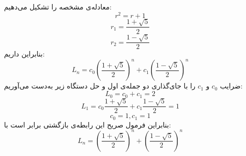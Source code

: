 	\p
معادله‌ی مشخصه را تشکیل می‌دهیم:
$$r^2 = r + 1$$
$$r_1 = \frac{1 + \sqrt{5}}{2}$$
$$r_2 = \frac{1 - \sqrt{5}}{2}$$
بنابراین داریم:
$$L_n = c_0(\frac{1 + \sqrt{5}}{2})^n + c_1(\frac{1 - \sqrt{5}}{2})^n$$
ضرایب 
$c_0$
و 
$c_1$
را با جای‌گذاری دو جمله‌ی اول و حل دستگاه زیر به‌دست می‌آوریم:
$$L_0 = c_0 + c_1 = 2$$
$$L_1 = c_0\frac{1 + \sqrt{5}}{2} + c_1\frac{1 - \sqrt{5}}{2} = 1$$
$$c_0 = 1, c_1 = 1$$
بنابراین فرمول صریح این رابطه‌ی بازگشتی برابر است با:
$$L_n = (\frac{1 + \sqrt{5}}{2})^n + (\frac{1 - \sqrt{5}}{2})^n$$